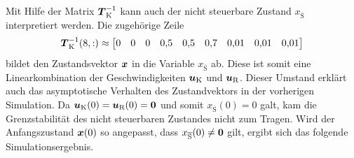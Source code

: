 Mit Hilfe der Matrix $\boldsymbol{T}^{-1}_{\text{K}}$ kann auch der nicht steuerbare Zustand $x_{\overline{\text{S}}}$ interpretiert werden. Die zugehörige Zeile
\begin{equation}
\boldsymbol{T}^{-1}_{\text{K}}(8,:) \approx \begin{bmatrix}
0 & 0 & 0 & 0{,}5 & 0{,}5 & 0{,}7 & 0{,}01 & 0{,}01 & 0{,}01
\end{bmatrix}
\end{equation}
bildet den Zustandsvektor $\boldsymbol{x}$ in die Variable $x_{\overline{\text{S}}}$ ab. Diese ist somit eine Linearkombination der Geschwindigkeiten $\boldsymbol{u}_{\text{K}}$ und $\boldsymbol{u}_{\text{R}}$. Dieser Umstand erklärt auch das asymptotische Verhalten des Zustandvektors in der vorherigen Simulation. Da $\boldsymbol{u}_{\text{K}}(0)=\boldsymbol{u}_{\text{R}}(0)=\boldsymbol{0}$ und somit $x_{\overline{\text{S}}}(0)=0$ galt, kam die Grenzstabilität des nicht steuerbaren Zustandes nicht zum Tragen. Wird der Anfangszustand $\boldsymbol{x}(0)$ so angepasst, dass $x_{\overline{\text{S}}}(0)\neq \boldsymbol{0}$ gilt, ergibt sich das folgende Simulationsergebnis.
\clearpage
